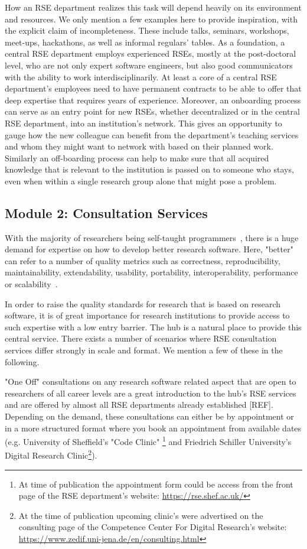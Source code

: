 \documentclass[a4paper]{article}
\begin{document}
How an RSE department realizes this task will depend heavily on its environment and resources. We only mention a few examples here to provide inspiration, with the explicit claim of incompleteness.
These include talks, seminars, workshops, meet-ups, hackathons, as well as informal regulars' tables.
As a foundation, a central RSE department employs experienced RSEs, mostly at the post-doctoral level, who are not only expert software engineers, but also good communicators with the ability to work interdisciplinarily.
At least a core of a central RSE department's employees need to have permanent contracts to be able to offer that deep expertise that requires years of experience.
Moreover, an onboarding process can serve as an entry point for new RSEs, whether decentralized or in the central RSE department, into an institution's network.
This gives an opportunity to gauge how the new colleague can benefit from the department's teaching services and whom they might want to network with based on their planned work.
Similarly an off-boarding process can help to make sure that all acquired knowledge that is relevant to the institution is passed on to someone who stays, even when within a single research group alone that might pose a problem.

\subsection{Module 2: Consultation Services}
\label{sec:consultation}

With the majority of researchers being self-taught programmers~\autocite{Carver2013}, there is a huge demand for expertise on how to develop better research software.
Here, "better" can refer to a number of quality metrics such as correctness, reproducibility, maintainability, extendability, usability, portability, interoperability, performance or scalability~\autocite[Chapter 16]{Schulmeyer2008}.

In order to raise the quality standards for research that is based on research software, it is of great importance for research institutions to provide access to such expertise with a low entry barrier.
The hub is a natural place to provide this central service.
There exists a number of scenarios where RSE consultation services differ strongly in scale and format.
We mention a few of these in the following.

"One Off" consultations on any research software related aspect that are open to researchers of all career levels are
a great introduction to the hub's RSE services and are offered by almost all RSE departments already established [REF].
Depending on the demand, these consultations can either be by appointment or in a more structured format where you book an appointment from available dates (e.g. University of Sheffield's "Code Clinic" \footnote{At time of publication the appointment form could be access from the front page of the RSE department’s website: \url{https://rse.shef.ac.uk/}} and Friedrich Schiller University’s Digital Research Clinic\footnote{At the time of publication upcoming clinic’s were advertised on the consulting page of the Competence Center For Digital Research’s website: \url{https://www.zedif.uni-jena.de/en/consulting.html}}).
\end{document}
